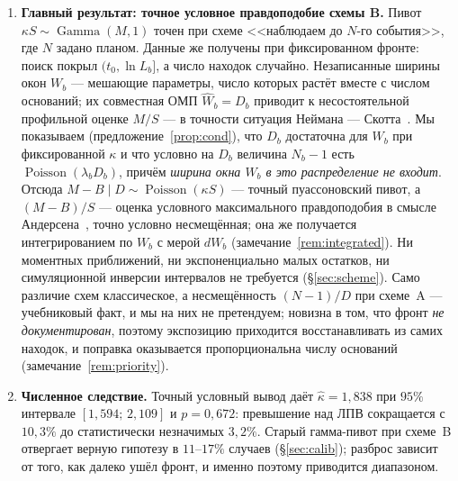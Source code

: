 \documentclass[11pt,a4paper]{article}
\theoremstyle{plain}
\theoremstyle{remark}
\DeclareMathOperator{\Gam}{Gamma}
\DeclareMathOperator{\Pois}{Poisson}
\begin{document}
\begin{enumerate}
\item\textbf{Главный результат: точное условное правдоподобие схемы B.} Пивот
$\kappa S\sim\Gam(M,1)$ точен при схеме <<наблюдаем до $N$-го события>>, где $N$
задано планом. Данные же получены при фиксированном фронте: поиск покрыл
$(t_0,\ln L_b]$, а число находок случайно. Незаписанные ширины окон $W_b$ ---
мешающие параметры, число которых растёт вместе с числом оснований; их
совместная ОМП $\hat W_b=D_b$ приводит к несостоятельной профильной оценке
$M/S$ --- в точности ситуация Неймана --- Скотта~\cite{neymanscott1948}. Мы
показываем (предложение~\ref{prop:cond}), что $D_b$ достаточна для $W_b$ при
фиксированной $\kappa$ и что условно на $D_b$ величина $N_b-1$ есть
$\Pois(\lambda_bD_b)$, причём \emph{ширина окна $W_b$ в это распределение не
входит}. Отсюда $M-B\mid D\sim\Pois(\kappa S)$ --- точный пуассоновский пивот,
а $(M-B)/S$ --- оценка условного максимального правдоподобия в смысле
Андерсена~\cite{andersen1970}, точно условно несмещённая; она же получается
интегрированием по $W_b$ с мерой $dW_b$ (замечание~\ref{rem:integrated}). Ни моментных
приближений, ни экспоненциально малых остатков, ни симуляционной инверсии
интервалов не требуется (\S\ref{sec:scheme}). Само различие схем классическое, а
несмещённость $(N-1)/D$ при схеме~A --- учебниковый факт, и мы на них не
претендуем; новизна в том, что фронт \emph{не документирован}, поэтому экспозицию
приходится восстанавливать из самих находок, и поправка оказывается
пропорциональна числу оснований (замечание~\ref{rem:priority}).

\item\textbf{Численное следствие.} Точный условный вывод даёт
$\hat\kappa=1{,}838$ при $95\%$ интервале $[1{,}594;\,2{,}109]$ и $p=0{,}672$:
превышение над ЛПВ сокращается с $10{,}3\%$ до статистически незначимых $3{,}2\%$.
Старый гамма-пивот при схеме~B отвергает верную
гипотезу в $11$--$17\%$ случаев (\S\ref{sec:calib}); разброс зависит от того, как
далеко ушёл фронт, и именно поэтому приводится диапазоном.


\end{enumerate}
\end{document}

